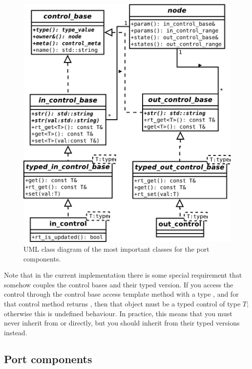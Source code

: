\begin{figure}[t]
  \centering
  \includegraphics[width=.8\textwidth]{pic/graph-ctl.pdf}
  \caption{UML class diagram of the most important classes for the
    port components.}
\label{fig:controls}
\end{figure}

Note that in the current implementation there is some special
requirement that somehow couples the control bases and their typed
version. If you access the control through the control base access
template method with a type , and for that control  method returns , then that object must be a
typed control of type $T$; otherwise this is undefined behaviour. In
practice, this means that you must never inherit from
 or  directly, but
you should inherit from their typed versions instead.

\subsection{Port components}
\label{sec:modports}

